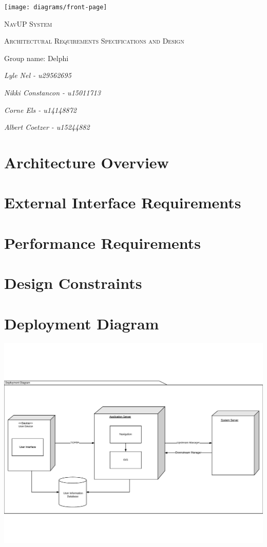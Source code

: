 \documentclass{article}
\begin{document}
\begin{titlepage}
	\centering
	\texttt{[image: diagrams/front-page]}
	\vfill
	{\scshape\LARGE NavUP System\par}
	\vfill
	{\scshape\Large Architectural Requirements Specifications and Design\par}
	\vfill
	{\Large Group name: Delphi\par}
	\bigskip 
	{\itshape\Large Lyle Nel - u29562695\par}
	{\itshape\Large Nikki Constancon - u15011713\par}
	{\itshape\Large Corne Els - u14148872\par}	
	{\itshape\Large Albert Coetzer - u15244882\par}
	\vfill
\end{titlepage}

\tableofcontents

\clearpage

\section{Architecture Overview}


\section{External Interface Requirements}


\section{Performance Requirements}


\section{Design Constraints}


\section{Deployment Diagram}
\includegraphics[width=\textwidth]{diagrams/Deployment_attempt}
\end{document}
